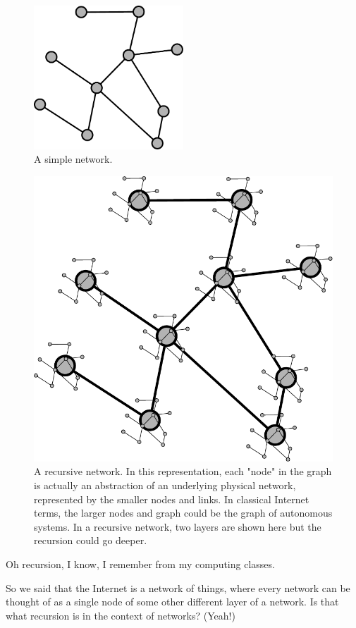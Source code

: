 \begin{figure}[t]
    \centering
    \includegraphics[width=0.5\textwidth]{lesson15/R2L15fig2.pdf}
    \caption[A simple network]{A simple network.}
    \label{fig:15-2-simple}
\end{figure}

\begin{figure}[t]
    \centering
    \includegraphics[width=.5\textwidth]{lesson15/R2L15fig3.pdf}
    \caption[A recursive network]{A recursive network. In this representation, each "node" in the graph is actually an abstraction of an underlying physical network, represented by the smaller nodes and links. In classical Internet terms, the larger nodes and graph could be the graph of autonomous systems.  In a  recursive network, two layers are shown here but the recursion could go deeper.}
    \label{fig:15-3-recursive}
\end{figure}

\mmm Oh recursion, I know, I remember from my computing classes.

So we said that the Internet is a network of things, where every network can be thought of as a single node of some other different layer of a network. Is that what recursion is in the context of networks? (Yeah!)

